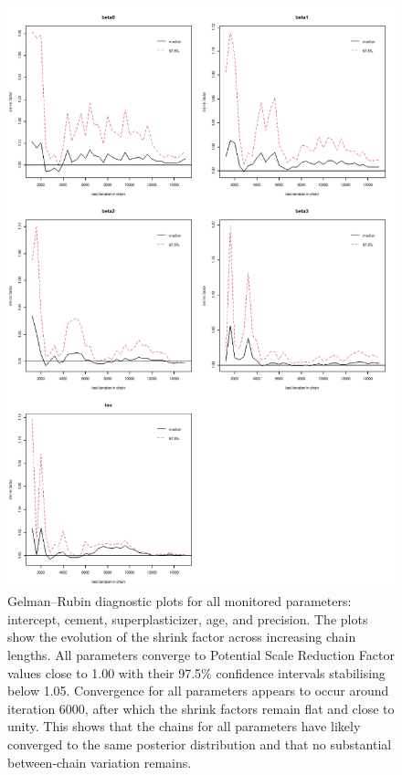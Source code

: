 \documentclass[]{article}
\begin{document}
\begin{figure}[H]
	\centering
	\includegraphics[width=0.7\linewidth]{img/img-gelman-plot-all}
	\caption{Gelman--Rubin diagnostic plots for all monitored parameters: intercept, cement, superplasticizer, age, and precision. The plots show the evolution of the shrink factor across increasing chain lengths. All parameters converge to Potential Scale Reduction Factor values close to 1.00 with their 97.5\% confidence intervals stabilising below 1.05. Convergence for all parameters appears to occur around iteration 6000, after which the shrink factors remain flat and close to unity. This shows that the chains for all parameters have likely converged to the same posterior distribution and that no substantial between-chain variation remains.}
	\label{fig:img-gelman-plot-all}
\end{figure}
\end{document}
